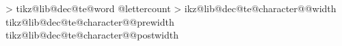 {    \fi%
    \tikz@lib@dec@te@addmacroto@parameters{\tikz@lib@dec@te@charactercount}{\tikz@lib@dec@te@lettercount}%
    \tikz@lib@dec@te@addmacroto@parameters{\tikz@lib@dec@te@charactercount}{\tikz@lib@dec@te@wordcount}%
    \tikz@lib@dec@te@addmacroto@parameters{\tikz@lib@dec@te@charactercount}{\tikz@lib@dec@te@character}%
    \let\tikz@lib@dec@te@lastcharactercount=\pgfmathcounter%
  \repeatpgfmathloop%
  \let\tikz@lib@dec@te@wordtotal=\tikz@lib@dec@te@wordcount%
  \pgfmathloop
  \ifnum\pgfmathcounter>\tikz@lib@dec@te@charactertotalcount%
  \else%
    \tikz@lib@dec@te@addmacroto@parameters{\pgfmathcounter}{\tikz@lib@dec@te@charactertotalcount}%
    \tikz@lib@dec@te@addmacroto@parameters{\pgfmathcounter}{\tikz@lib@dec@te@wordtotal}%
    \expandafter\let\expandafter\tikz@lib@dec@te@lettertotalcount\expandafter=\csname tikz@lib@dec@te@word \tikz@lib@dec@te@wordcount @lettercount\endcsname%
    \tikz@lib@dec@te@addmacroto@parameters{\pgfmathcounter}{\tikz@lib@dec@te@lettertotalcount}%
  \repeatpgfmathloop%
  \def\tikz@lib@dec@te@textwidth{0pt}%
  \pgfmathloop%
  \ifnum\pgfmathcounter>\tikz@lib@dec@te@charactertotalcount%
  \else%
    \def\tikz@lib@dec@te@characterwidth{0pt}%
    \tikz@lib@dec@te@getcharacterwidth{\pgfmathcounter}%
    \expandafter\let\csname tikz@lib@dec@te@character@\pgfmathcounter @width\endcsname=\tikz@lib@dec@te@characterwidth%
    \pgf@x=\tikz@lib@dec@te@characterwidth\relax%
    \pgf@x%
    \expandafter\edef\csname tikz@lib@dec@te@character@\pgfmathcounter @prewidth\endcsname{\the\pgf@x}%
    \expandafter\edef\csname tikz@lib@dec@te@character@\pgfmathcounter @postwidth\endcsname{\the\pgf@x}%
    \tikz@lib@dec@te@advancedimenmacro{\tikz@lib@dec@te@textwidth}{\tikz@lib@dec@te@characterwidth}%
  \repeatpgfmathloop%
}

\def\tikz@lib@dec@te@spacetoken{ }

\let\tikz@lib@dec@te@wordsep=\tikz@lib@dec@te@spacetoken


%
%
%
\def\tikz@lib@dec@te@scancharacters#1{%
  \def\tikz@lib@dec@te@@@scancharacters@process{#1}%
  \def\tikz@lib@dec@te@scancount{0}%
  \expandafter\tikz@lib@dec@te@@scancharacters\tikz@lib@dec@te@text\tikz@lib@dec@te@scancharacters}%

